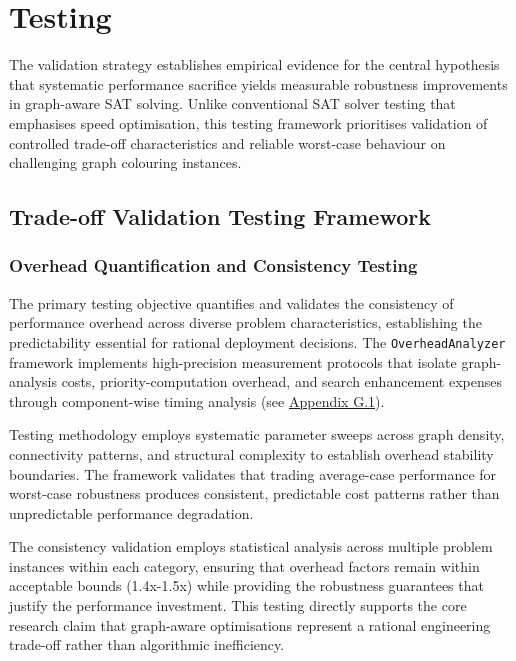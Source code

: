 \section{Testing}
\label{sec:testing}

The validation strategy establishes empirical evidence for the central hypothesis that systematic performance sacrifice yields measurable robustness improvements in graph-aware SAT solving. Unlike conventional SAT solver testing that emphasises speed optimisation, this testing framework prioritises validation of controlled trade-off characteristics and reliable worst-case behaviour on challenging graph colouring instances.

\subsection{Trade-off Validation Testing Framework}
\label{sec:tradeoff-validation-framework}

\subsubsection{Overhead Quantification and Consistency Testing}
\label{sec:overhead-quantification}

The primary testing objective quantifies and validates the consistency of performance overhead across diverse problem characteristics, establishing the predictability essential for rational deployment decisions. The \texttt{OverheadAnalyzer} framework implements high-precision measurement protocols that isolate graph-analysis costs, priority-computation overhead, and search enhancement expenses through component-wise timing analysis (see \hyperref[appendix:overhead-measurement]{Appendix G.1}).

Testing methodology employs systematic parameter sweeps across graph density, connectivity patterns, and structural complexity to establish overhead stability boundaries. The framework validates that trading average-case performance for worst-case robustness produces consistent, predictable cost patterns rather than unpredictable performance degradation.

The consistency validation employs statistical analysis across multiple problem instances within each category, ensuring that overhead factors remain within acceptable bounds (1.4x-1.5x) while providing the robustness guarantees that justify the performance investment. This testing directly supports the core research claim that graph-aware optimisations represent a rational engineering trade-off rather than algorithmic inefficiency.

